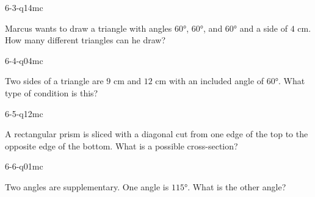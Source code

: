 \begin{practiceQuestion}{6-3-q14}{mc}
\begin{questionText}
Marcus wants to draw a triangle with angles $60°$, $60°$, and $60°$ and a side of $4$ cm. How many different triangles can he draw?
\end{questionText}
\end{practiceQuestion}

\begin{practiceQuestion}{6-4-q04}{mc}
\begin{questionText}
Two sides of a triangle are $9$ cm and $12$ cm with an included angle of $60°$. What type of condition is this?
\end{questionText}
\end{practiceQuestion}

\begin{practiceQuestion}{6-5-q12}{mc}
\begin{questionText}
A rectangular prism is sliced with a diagonal cut from one edge of the top to the opposite edge of the bottom. What is a possible cross-section?
\end{questionText}
\end{practiceQuestion}

\begin{practiceQuestion}{6-6-q01}{mc}
\begin{questionText}
Two angles are supplementary. One angle is $115°$. What is the other angle?
\end{questionText}
\end{practiceQuestion}

